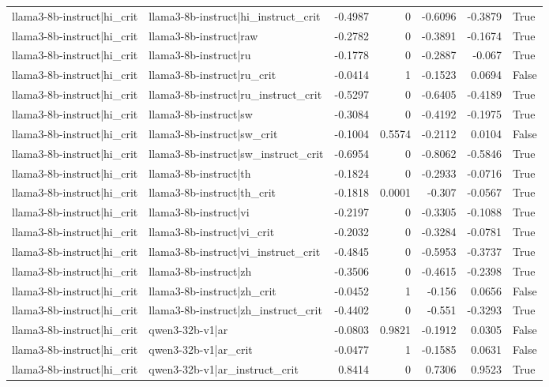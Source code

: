 \begin{table}
\begin{tabular}{l l r r r r l}
llama3-8b-instruct|hi_crit & llama3-8b-instruct|hi_instruct_crit & -0.4987 & 0 & -0.6096 & -0.3879 & True \\
llama3-8b-instruct|hi_crit & llama3-8b-instruct|raw & -0.2782 & 0 & -0.3891 & -0.1674 & True \\
llama3-8b-instruct|hi_crit & llama3-8b-instruct|ru & -0.1778 & 0 & -0.2887 & -0.067 & True \\
llama3-8b-instruct|hi_crit & llama3-8b-instruct|ru_crit & -0.0414 & 1 & -0.1523 & 0.0694 & False \\
llama3-8b-instruct|hi_crit & llama3-8b-instruct|ru_instruct_crit & -0.5297 & 0 & -0.6405 & -0.4189 & True \\
llama3-8b-instruct|hi_crit & llama3-8b-instruct|sw & -0.3084 & 0 & -0.4192 & -0.1975 & True \\
llama3-8b-instruct|hi_crit & llama3-8b-instruct|sw_crit & -0.1004 & 0.5574 & -0.2112 & 0.0104 & False \\
llama3-8b-instruct|hi_crit & llama3-8b-instruct|sw_instruct_crit & -0.6954 & 0 & -0.8062 & -0.5846 & True \\
llama3-8b-instruct|hi_crit & llama3-8b-instruct|th & -0.1824 & 0 & -0.2933 & -0.0716 & True \\
llama3-8b-instruct|hi_crit & llama3-8b-instruct|th_crit & -0.1818 & 0.0001 & -0.307 & -0.0567 & True \\
llama3-8b-instruct|hi_crit & llama3-8b-instruct|vi & -0.2197 & 0 & -0.3305 & -0.1088 & True \\
llama3-8b-instruct|hi_crit & llama3-8b-instruct|vi_crit & -0.2032 & 0 & -0.3284 & -0.0781 & True \\
llama3-8b-instruct|hi_crit & llama3-8b-instruct|vi_instruct_crit & -0.4845 & 0 & -0.5953 & -0.3737 & True \\
llama3-8b-instruct|hi_crit & llama3-8b-instruct|zh & -0.3506 & 0 & -0.4615 & -0.2398 & True \\
llama3-8b-instruct|hi_crit & llama3-8b-instruct|zh_crit & -0.0452 & 1 & -0.156 & 0.0656 & False \\
llama3-8b-instruct|hi_crit & llama3-8b-instruct|zh_instruct_crit & -0.4402 & 0 & -0.551 & -0.3293 & True \\
llama3-8b-instruct|hi_crit & qwen3-32b-v1|ar & -0.0803 & 0.9821 & -0.1912 & 0.0305 & False \\
llama3-8b-instruct|hi_crit & qwen3-32b-v1|ar_crit & -0.0477 & 1 & -0.1585 & 0.0631 & False \\
llama3-8b-instruct|hi_crit & qwen3-32b-v1|ar_instruct_crit & 0.8414 & 0 & 0.7306 & 0.9523 & True \\

\end{tabular}
\end{table}
